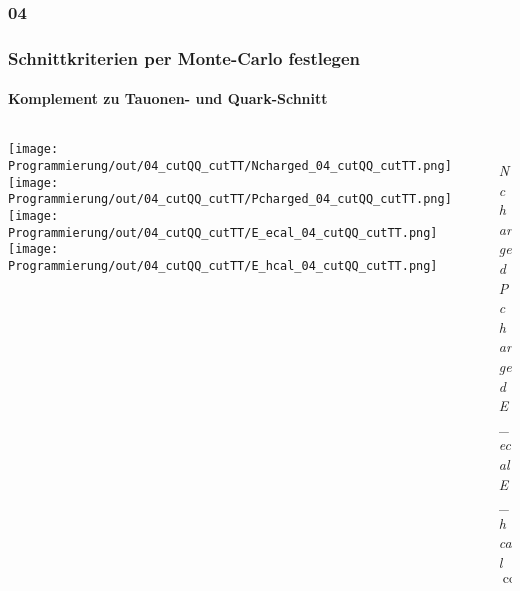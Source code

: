 \documentclass{beamer}
\begin{document}
\subsubsection{04}
\begin{frame}
	\frametitle{Schnittkriterien per Monte-Carlo festlegen}
	\framesubtitle{Komplement zu Tauonen- und Quark-Schnitt}
	\begin{columns}
		\begin{column}{0.95\textwidth}
			\texttt{[image: Programmierung/out/04\_cutQQ\_cutTT/Ncharged\_04\_cutQQ\_cutTT.png]}
			\texttt{[image: Programmierung/out/04\_cutQQ\_cutTT/Pcharged\_04\_cutQQ\_cutTT.png]}
			\newline
			\texttt{[image: Programmierung/out/04\_cutQQ\_cutTT/E\_ecal\_04\_cutQQ\_cutTT.png]}
			\texttt{[image: Programmierung/out/04\_cutQQ\_cutTT/E\_hcal\_04\_cutQQ\_cutTT.png]}
		\end{column}
		\begin{column}{0.2\textwidth}
			\\
			{\color{blue}\textit{Ncharged}}\newline
					\\
			{\color{blue}\textit{Pcharged}}\newline
					\\
			{\color[rgb]{0.6,0.6,0}\textit{E\_ecal}}\newline
					\\
			{\color[rgb]{1,0,1}\textit{E\_hcal}}\newline
					\\
			$\cos\_thet$\newline
								\\
			\\
			\\
			\\
			\\
		\end{column}
	\end{columns}
\end{frame}
\end{document}
